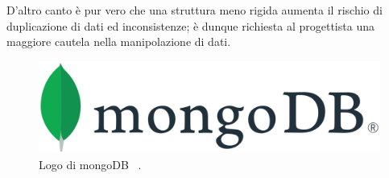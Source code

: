 \noindent D'altro canto è pur vero che una struttura meno rigida aumenta il rischio di duplicazione di dati ed inconsistenze; è dunque richiesta al progettista una maggiore cautela nella manipolazione di dati.
\begin{figure}[H]
    \centering
    \includegraphics[width=0.5\linewidth]{img/logos/mongo_logo.png}
    \caption{Logo di mongoDB ~\cite{Ildataba34:online}.}
    \label{mongoLogo}
\end{figure}

\newpage